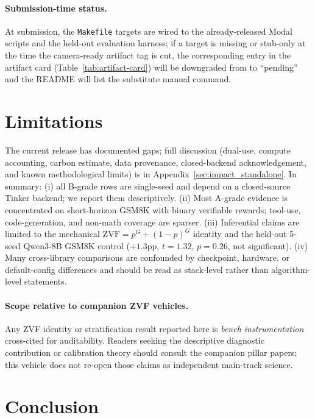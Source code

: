 \documentclass{article}
\begin{document}
\paragraph{Submission-time status.}
At submission, the \texttt{Makefile} targets are wired to the
already-released Modal scripts and the held-out evaluation harness; if a
target is missing or stub-only at the time the camera-ready artifact tag
is cut, the corresponding entry in the artifact card
(Table~\ref{tab:artifact-card}) will be downgraded from \checkmark{} to
``pending'' and the README will list the substitute manual command.
 
\section{Limitations}
\label{sec:limitations}


The current release has documented gaps; full discussion (dual-use,
compute accounting, carbon estimate, data provenance, closed-backend
acknowledgement, and known methodological limits) is in
Appendix~\ref{sec:impact_standalone}. In summary: (i) all B-grade rows are
single-seed and depend on a closed-source Tinker backend; we report them
descriptively. (ii) Most A-grade evidence is concentrated on
short-horizon GSM8K with binary verifiable rewards; tool-use,
code-generation, and non-math coverage are sparser. (iii) Inferential
claims are limited to the mechanical
$\mathrm{ZVF} = p^G + (1{-}p)^G$ identity and the held-out 5-seed
Qwen3-8B GSM8K control ($+1.3$pp, $t{=}1.32$, $p{=}0.26$, not
significant). (iv) Many cross-library comparisons are confounded by
checkpoint, hardware, or default-config differences and should be read
as stack-level rather than algorithm-level statements.

\paragraph{Scope relative to companion ZVF vehicles.}
Any ZVF identity or stratification result reported here is \emph{bench
instrumentation} cross-cited for auditability. Readers seeking the
descriptive diagnostic contribution or calibration theory should consult the
companion pillar papers; this vehicle does not re-open those claims as
independent main-track science.

\section{Conclusion}
\label{sec:conclusion}
\end{document}
